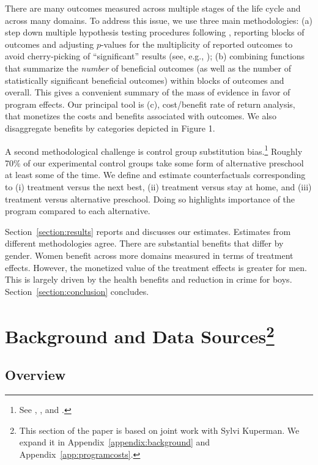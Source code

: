 There are many outcomes measured across multiple stages of the life cycle and across many domains. To address this issue, we use three main methodologies: (a) step down multiple hypothesis testing procedures following \cite{Romano_Wolf_2005_JASA}, reporting blocks of outcomes and adjusting $p$-values for the multiplicity of reported outcomes to avoid cherry-picking of ``significant'' results (see, e.g., \citealp{Heckman_Moon_etal_2010_QE}); (b) combining functions that summarize the \emph{number} of beneficial outcomes (as well as the number of statistically significant beneficial outcomes) within blocks of outcomes and overall. This gives a convenient summary of the mass of evidence in favor of program effects. Our principal tool is (c), cost/benefit rate of return analysis, that monetizes the costs and benefits associated with outcomes. We also disaggregate benefits by categories depicted in Figure 1.

A second methodological challenge is control group substitution bias.\footnote{See \cite{Heckman_1992_randomization}, \cite{Heckman_Hohmann_etal_2000_QJE}, and \cite{Kline-Walters_2016_QJE}.} Roughly 70\% of our experimental control groups take some form of alternative preschool at least some of the time. We define and estimate counterfactuals corresponding to (i) treatment versus the next best, (ii) treatment versus stay at home, and (iii) treatment versus alternative preschool. Doing so highlights importance of the program compared to each alternative.

Section~\ref{section:results} reports and discusses our estimates. Estimates from different methodologies agree. There are substantial benefits that differ by gender. Women benefit across more domains measured in terms of treatment effects. However, the monetized value of the treatment effects is greater for men. This is largely driven by the health benefits and reduction in crime for boys. Section~\ref{section:conclusion} concludes.

\section[Background and Data Sources]{Background and Data Sources\footnote{This section of the paper is based on joint work with Sylvi Kuperman. We expand it  in Appendix~\ref{appendix:background} and Appendix~\ref{app:programcosts}.}} \label{section:background}

\subsection{Overview}


